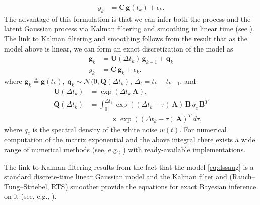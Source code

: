 \documentclass[journal]{IEEEtran}
\begin{document}
%
\begin{equation}
\begin{split}
  y_k &= \mathbf{C} \, \mathbf{g}(t_k) + \epsilon_k.
\end{split}
\label{eq:ssaugkf}
\end{equation}
%
The advantage of this formulation is that we can infer both the process and the latent Gaussian process via Kalman filtering and smoothing in linear time (see \cite{Hartikainen+Sarkka:2010,Sarkka+Solin+Hartikainen:2013}). The link to Kalman filtering and smoothing follows from the result that as the model above is linear, we can form an exact discretization of the model as
%
\begin{equation}
\begin{split}
  \mathbf{g}_k
  &= \mathbf{U}(\Delta t_k) \, \mathbf{g}_{k-1}
  + \mathbf{q}_k \\
  y_k &= \mathbf{C} \, \mathbf{g}_k + \epsilon_k.
\end{split}
\label{eq:dssaug}
\end{equation}
%
where $\mathbf{g}_k \triangleq \mathbf{g}(t_k)$, $\mathbf{q}_k \sim \mathcal{N}(0,\mathbf{Q}(\Delta t_k)$, $\Delta_t = t_k - t_{k-1}$, and
%
\begin{equation}
\begin{split}
  \mathbf{U}(\Delta t_k)  &= \exp(\Delta t_k \, \mathbf{A}), \\
  \mathbf{Q}(\Delta t_k) &= \int_0^{\Delta t_k} \exp((\Delta t_k - \tau) \, \mathbf{A}) \,
  \mathbf{B} \, q_c  \, \mathbf{B}^T \\
  &\qquad \quad \times \exp((\Delta t_k - \tau) \, \mathbf{A})^T \, d\tau,
\end{split}
\label{eq:dssaug}
\end{equation}
%
where $q_c$ is the spectral density of the white noise $w(t)$. For numerical computation of the matrix exponential and the above integral there exists a wide range of numerical methods (see, e.g., \cite{Grewal+Andrews:2001,Sarkka:2006}) with ready-available implementations.

The link to Kalman filtering results from the fact that the model \eqref{eq:dssaug} is a standard discrete-time linear Gaussian model and the Kalman filter and (Rauch--Tung--Striebel, RTS) smoother provide the equations for exact Bayesian inference on it (see, e.g., \cite{Sarkka:2013}). 
\end{document}
